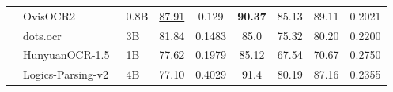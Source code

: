 \documentclass{fairmeta}
\begin{document}
\begin{table}[h]
{\begin{tabular}{c|l l|c|c c c c c}
    & OvisOCR2~\cite{lu2026ovisocr2} & 0.8B & \underline{87.91} & 0.129 & \textbf{90.37} & 85.13 & 89.11 & 0.2021 \\
    & dots.ocr~\cite{dots_ocr} & 3B & 81.84 & 0.1483 & 85.0 & 75.32 & 80.20 & 0.2200 \\
    & HunyuanOCR-1.5~\cite{li2026hunyuanocr} & 1B & 77.62 & 0.1979 & 85.12 & 67.54 & 70.67 & 0.2750 \\
    & Logics-Parsing-v2~\cite{LogicsParsing} & 4B & 77.10 & 0.4029 & 91.4 & 80.19 & 87.16 & 0.2355 \\
    \bottomrule
    \end{tabular}%
  }
  \label{tab:Wild_result}
  \vspace{-4pt}
\end{table}


\end{document}
